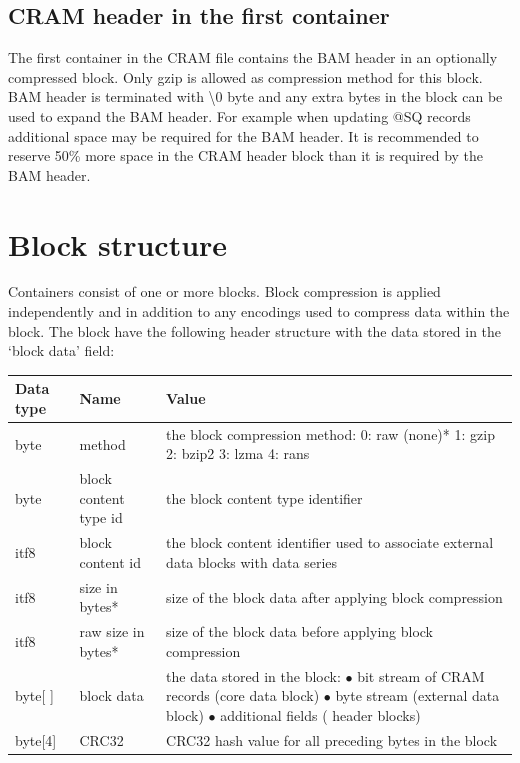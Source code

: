 \documentclass[a4paper]{article}
\begin{document}
\subsection{\textbf{CRAM header in the first container}}

The first container in the CRAM file contains the BAM header in an optionally
compressed block. Only gzip is allowed as compression method for this block. BAM
header is terminated with \textbackslash{}0 byte and any extra bytes in the
block can be used to expand the BAM header. For example when updating @SQ
records additional space may be required for the BAM header. It is recommended
to reserve 50\% more space in the CRAM header block than it is required by the
BAM header.

\section{\textbf{Block structure}}

Containers consist of one or more blocks. Block compression is applied independently 
and in addition to any encodings used to compress data within the block. The block 
have the following header structure with the data stored in the `block data' field:

\begin{tabular}{|l|>{\raggedright}p{120pt}|>{\raggedright}p{260pt}|}
\hline
\textbf{Data type} & \textbf{Name} & \textbf{Value}
\tabularnewline
\hline
byte & method & the block compression method: \linebreak{}
0: raw (none)*\linebreak{}
1: gzip\linebreak{}
2: bzip2\linebreak{}
3: lzma\linebreak{}
4: rans\tabularnewline
\hline
byte & block content type id & the block content type identifier\tabularnewline
\hline
itf8 & block content id & the block content identifier used to associate external 
data blocks with data series\tabularnewline
\hline
itf8 & size in bytes* & size of the block data after applying block compression\tabularnewline
\hline
itf8 & raw size in bytes* & size of the block data before applying block compression\tabularnewline
\hline
byte[ ] & block data & the data stored in the block:\linebreak{}
$\bullet$ bit stream of CRAM records (core data block)\linebreak{}
$\bullet$ byte stream (external data block)\linebreak{}
$\bullet$ additional fields ( header blocks)\tabularnewline
\hline
byte[4] & CRC32 & CRC32 hash value for all preceding bytes in the block\tabularnewline
\hline
\end{tabular}
\end{document}
